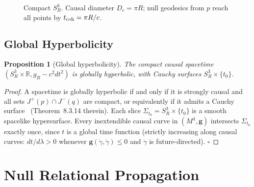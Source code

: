 \documentclass[12pt,a4paper]{article}
\theoremstyle{plain}
\newtheorem{proposition}[theorem]{Proposition}
\theoremstyle{definition}
\theoremstyle{remark}
\begin{document}
\begin{figure}[h!]
\centering
{}
\caption{Compact $S^3_R$. Causal diameter $D_c = \pi R$; null geodesics from $p$
  reach all points by $t_{\rm coh} = \pi R/c$.}
\label{fig:s3}
\end{figure}

\subsection{Global Hyperbolicity}

\begin{proposition}[Global hyperbolicity]
\label{prop:GH}
The compact causal spacetime $(S^3_R \times \mathbb{R}, g_R - c^2 dt^2)$
is globally hyperbolic, with Cauchy surfaces $S^3_R \times \{t_0\}$.
\end{proposition}

\begin{proof}
A spacetime is globally hyperbolic if and only if it is strongly causal and
all sets $J^+(p)\cap J^-(q)$ are compact, or equivalently if it admits a
Cauchy surface~\cite{Wald84} (Theorem~8.3.14 therein).
Each slice $\Sigma_{t_0} = S^3_R \times \{t_0\}$ is a smooth spacelike hypersurface.
Every inextendible causal curve in $(M^4, \mathbf{g})$ intersects
$\Sigma_{t_0}$ exactly once, since $t$ is a global time function
(strictly increasing along causal curves: $dt/d\lambda > 0$ whenever
$\mathbf{g}(\dot\gamma,\dot\gamma) \le 0$ and $\dot\gamma$ is future-directed).
\hfill$\square$
\end{proof}

\section{Null Relational Propagation}
\label{sec:null}
\end{document}
